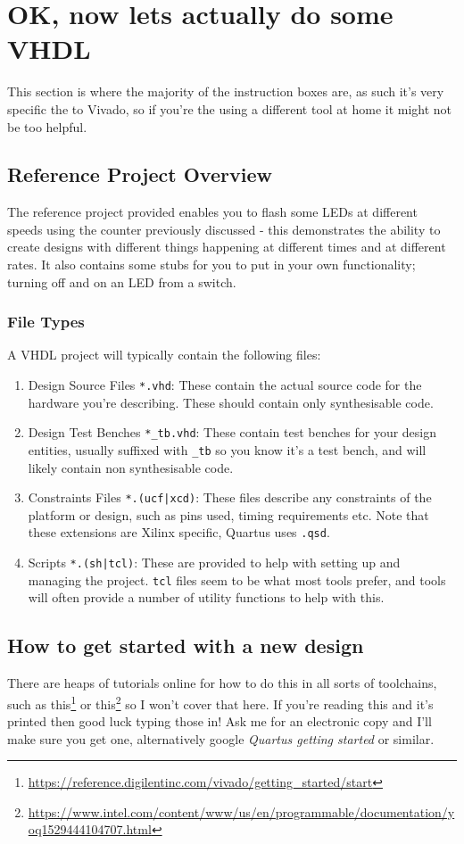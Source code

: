 \section{OK, now lets actually do some VHDL}\label{section:vhdl}

This section is where the majority of the instruction boxes are, as such it's very specific the to Vivado, so if you're the using a different tool at home it might not be too helpful.

\subsection{Reference Project Overview}
The reference project provided enables you to flash some LEDs at different speeds using the counter previously discussed - this demonstrates the ability to create designs with different things happening at different times and at different rates. It also contains some stubs for you to put in your own functionality; turning off and on an LED from a switch. 

\subsubsection{File Types}
A VHDL project will typically contain the following files:
\begin{enumerate}
    \item Design Source Files \texttt{*.vhd}: These contain the actual source code for the hardware you're describing. These should contain only synthesisable code.
    \item Design Test Benches \texttt{*\_tb.vhd}: These contain test benches for your design entities, usually suffixed with \texttt{\_tb} so you know it's a test bench, and will likely contain non synthesisable code.
    \item Constraints Files \texttt{*.(ucf|xcd)}: These files describe any constraints of the platform or design, such as pins used, timing requirements etc. Note that these extensions are Xilinx specific, Quartus uses \texttt{.qsd}.
    \item Scripts \texttt{*.(sh|tcl)}: These are provided to help with setting up and managing the project. \texttt{tcl} files seem to be what most tools prefer, and tools will often provide a number of utility functions to help with this. 
\end{enumerate}

\subsection{How to get started with a new design}
There are heaps of tutorials online for how to do this in all sorts of toolchains, such as this\footnote{\url{https://reference.digilentinc.com/vivado/getting_started/start}} or this\footnote{\url{https://www.intel.com/content/www/us/en/programmable/documentation/yoq1529444104707.html}} so I won't cover that here. If you're reading this and it's printed then good luck typing those in! Ask me for an electronic copy and I'll make sure you get one, alternatively google \emph{Quartus getting started} or similar.

